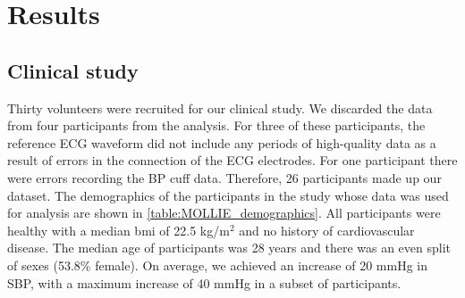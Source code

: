 \documentclass[fleqn,10pt]{wlscirep}
\begin{document}
\section{Results}
\subsection{Clinical study}


Thirty volunteers were recruited for our clinical study. We discarded the data from four participants from the analysis. For three of these participants, the reference ECG waveform did not include any periods of high-quality data as a result of errors in the connection of the ECG electrodes. For one participant there were errors recording the BP cuff data. Therefore, 26 participants made up our dataset. The demographics of the participants in the study whose data was used for analysis are shown in \cref{table:MOLLIE_demographics}. All participants were healthy with a median \ac{bmi} of 22.5 kg/m$^{2}$ and no history of cardiovascular disease. The median age of participants was 28 years and there was an even split of sexes (53.8\% female). On average, we achieved an increase of 20 mmHg in SBP, with a maximum increase of 40 mmHg in a subset of participants. 
\end{document}
